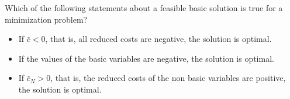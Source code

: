  Which of the following statements about a feasible basic solution is true for a minimization problem?

\begin{itemize}
\item[(a)] {If $\bar{c} < 0$, that is, all reduced costs are negative, the solution is optimal.}
\item[(b)] {If the values of the basic variables are negative, the solution is optimal.}
\item[(c)] {If $\bar{c}_N > 0$, that is, the reduced costs of the non basic variables are positive, the solution is optimal.}
\end{itemize}

